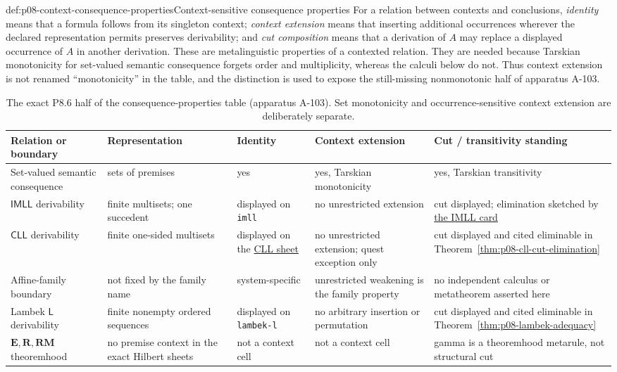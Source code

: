 \begin{hbdefinition}{def:p08-context-consequence-properties}{Context-sensitive consequence properties}
For a relation between contexts and conclusions, \emph{identity} means that a
formula follows from its singleton context; \emph{context extension} means
that inserting additional occurrences wherever the declared representation
permits preserves derivability; and \emph{cut composition} means that a
derivation of \(A\) may replace a displayed occurrence of \(A\) in another
derivation.  These are metalinguistic properties of a contexted relation.  They
are needed because Tarskian monotonicity for set-valued semantic consequence
forgets order and multiplicity, whereas the calculi below do not.  Thus context
extension is not renamed ``monotonicity'' in the table, and the distinction is
used to expose the still-missing nonmonotonic half of apparatus A-103.
\end{hbdefinition}

\begin{table}[!htbp]
\centering
\begingroup\scriptsize
\setlength{\tabcolsep}{3pt}
\begin{tabular}{@{}p{}p{}p{}
  p{}p{}@{}}
\toprule
Relation or boundary & Representation & Identity & Context extension & Cut /
transitivity standing \\
\midrule
Set-valued semantic consequence & sets of premises & yes & yes, Tarskian
monotonicity & yes, Tarskian transitivity \\
\(\mathsf{IMLL}\) derivability & finite multisets; one succedent & displayed
on \texttt{imll} & no unrestricted extension & cut displayed; elimination
sketched by \hyperref[entry:p08-imll]{the IMLL card} \\
\(\mathsf{CLL}\) derivability & finite one-sided multisets & displayed on the
\hyperref[sheet:cll-one-sided]{CLL sheet} & no unrestricted extension; quest
exception only &
cut displayed and cited eliminable in
Theorem~\ref{thm:p08-cll-cut-elimination} \\
Affine-family boundary & not fixed by the family name & system-specific &
unrestricted weakening is the family property & no independent calculus or
metatheorem asserted here \\
Lambek \(\mathsf L\) derivability & finite nonempty ordered sequences &
displayed on \texttt{lambek-l} & no arbitrary insertion or permutation & cut
displayed and cited eliminable in Theorem~\ref{thm:p08-lambek-adequacy} \\
\(\mathbf E,\mathbf R,\mathbf{RM}\) theoremhood & no premise context in the
exact Hilbert sheets & not a context cell & not a context cell & gamma is a
theoremhood metarule, not structural cut \\
\bottomrule
\end{tabular}
\endgroup
\caption{The exact P8.6 half of the consequence-properties table (apparatus
A-103).  Set monotonicity and occurrence-sensitive context extension are
deliberately separate.}
\label{tab:p08-consequence-properties}
\end{table}

